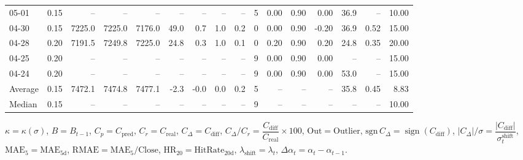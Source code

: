 \begin{threeparttable}
{\begin{tabular}{lrrrrrrrrrrrrrrr}
  05-01 &     0.15 &     -- &     -- &     -- &         -- &             -- &                       -- &                  -- &              5 &       0.00 &      0.90 &           0.00 &             36.9 &              -- &                  10.00 \\
  04-30 &     0.15 & 7225.0 & 7225.0 & 7176.0 &       49.0 &            0.7 &                      1.0 &                 0.2 &              0 &       0.00 &      0.90 &          -0.20 &             36.9 &            0.52 &                  15.00 \\
  04-28 &     0.20 & 7191.5 & 7249.8 & 7225.0 &       24.8 &            0.3 &                      1.0 &                 0.1 &              0 &       0.20 &      0.90 &           0.20 &             24.8 &            0.35 &                  20.00 \\
  04-25 &     0.20 &     -- &     -- &     -- &         -- &             -- &                       -- &                  -- &              9 &       0.00 &      0.90 &           0.00 &               -- &              -- &                  15.00 \\
  04-24 &     0.20 &     -- &     -- &     -- &         -- &             -- &                       -- &                  -- &              9 &       0.00 &      0.90 &           0.00 &             53.0 &              -- &                  15.00 \\
Average &     0.15 & 7472.1 & 7474.8 & 7477.1 &       -2.3 &           -0.0 &                      0.0 &                 0.2 &              5 &         -- &        -- &             -- &             35.8 &            0.45 &                   8.83 \\
 Median &     0.15 &     -- &     -- &     -- &         -- &             -- &                       -- &                  -- &              9 &         -- &        -- &             -- &               -- &              -- &                  10.00 \\
\bottomrule
\end{tabular}
}
\begin{tablenotes}\footnotesize
\item $\kappa=\kappa(\sigma)$, $B=B_{t-1}$, $C_p=C_{\text{pred}}$, $C_r=C_{\text{real}}$, $C_\Delta=C_{\text{diff}}$, $C_\Delta/C_r=\dfrac{C_{\text{diff}}}{C_{\text{real}}}\times100$, $\mathrm{Out}=\text{Outlier}$, $\mathrm{sgn}\,C_\Delta=\operatorname{sign}(C_{\text{diff}})$, $|C_\Delta|/\sigma=\dfrac{|C_{\text{diff}}|}{\sigma_t^{\text{shift}}}$, $\mathrm{MAE}_5=\mathrm{MAE}_{5\text{d}}$, $\mathrm{RMAE}= \mathrm{MAE}_5 / \text{Close}$, $\mathrm{HR}_{20}=\mathrm{HitRate}_{20\text{d}}$, 
$\lambda_{\text{shift}}=\lambda_t$, 
$\Delta\alpha_t=\alpha_t-\alpha_{t-1}$.
\end{tablenotes}
\end{threeparttable}
\endgroup


